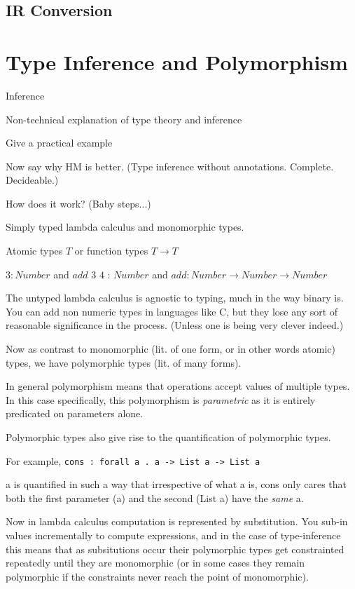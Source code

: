 \documentclass{l4proj}
\begin{document}
\subsection{IR Conversion}

\section{Type Inference and Polymorphism}
Inference

Non-technical explanation of type theory and inference

Give a practical example

Now say why HM is better. (Type inference without annotations. Complete. Decideable.)

How does it work? (Baby steps...)

Simply typed lambda calculus and monomorphic types.

Atomic types $T$ or function types $T \rightarrow T$

$3 : Number$ and $add$ $3$ $4$ : $Number$ and $add : Number \rightarrow Number \rightarrow Number$

The untyped lambda calculus is agnostic to typing, much in the way binary is. You can add non numeric types in languages like C, but they lose any sort of reasonable significance in the process. (Unless one is being very clever indeed.)

Now as contrast to monomorphic (lit. of one form, or in other words atomic) types, we have polymorphic types (lit. of many forms).

In general polymorphism means that operations accept values of multiple types. In this case specifically, this polymorphism is \emph{parametric} as it is entirely predicated on parameters alone.

Polymorphic types also give rise to the quantification of polymorphic types.

For example, \texttt{cons : forall a . a -> List a -> List a}

a is quantified in such a way that irrespective of what a is, cons only cares that both the first parameter (a) and the second (List a) have the \emph{same} a.

Now in lambda calculus computation is represented by substitution.
You sub-in values incrementally to compute expressions, and in the case of type-inference this means that as subsitutions occur their polymorphic types get constrainted repeatedly until they are monomorphic (or in some cases they remain polymorphic if the constraints never reach the point of monomorphic).
\end{document}
